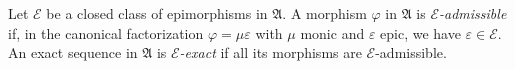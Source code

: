 Let $\mathcal{E}$ be a closed class of epimorphisms in $\mathfrak{A}$. A morphism $\varphi$ in $\mathfrak{A}$ is \textit{$\mathcal{E}$-admissible} if, in the canonical factorization $\varphi = \mu \varepsilon$ with $\mu$ monic and $\varepsilon$ epic, we have $\varepsilon \in \mathcal{E}$. An exact sequence in $\mathfrak{A}$ is \textit{$\mathcal{E}$-exact} if all its morphisms are $\mathcal{E}$-admissible.